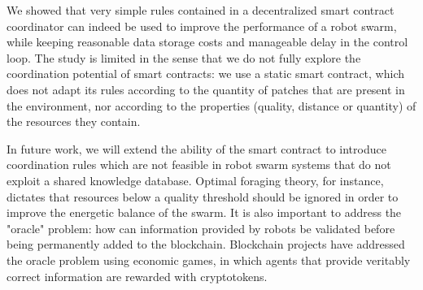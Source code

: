\documentclass[runningheads]{llncs}
\begin{document}
We showed that very simple rules contained in a decentralized smart contract coordinator can indeed be used to improve the performance of a robot swarm, while keeping reasonable data storage costs and manageable delay in the control loop. The study is limited in the sense that we do not fully explore the coordination potential of smart contracts: we use a static smart contract, which does not adapt its rules according to the quantity of patches that are present in the environment, nor according to the properties (quality, distance or quantity) of the resources they contain.

In future work, we will extend the ability of the smart contract to introduce coordination rules which are not feasible in robot swarm systems that do not exploit a shared knowledge database. Optimal foraging theory, for instance, dictates that resources below a quality threshold should be ignored in order to improve the energetic balance of the swarm. It is also important to address the "oracle" problem: how can information provided by robots be validated before being permanently added to the blockchain. Blockchain projects have addressed the oracle problem using economic games, in which agents that provide veritably correct information are rewarded with cryptotokens.






\end{document}
